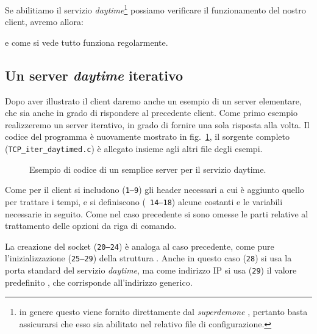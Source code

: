 Se abilitiamo il servizio \textit{daytime}\footnote{in genere questo viene
  fornito direttamente dal \textsl{superdemone} , pertanto basta
  assicurarsi che esso sia abilitato nel relativo file di configurazione.}
possiamo verificare il funzionamento del nostro client, avremo allora:
e come si vede tutto funziona regolarmente.


\subsection{Un server \textit{daytime} iterativo}
\label{sec:TCP_daytime_iter_server}

Dopo aver illustrato il client daremo anche un esempio di un server
elementare, che sia anche in grado di rispondere al precedente client. Come
primo esempio realizzeremo un server iterativo, in grado di fornire una sola
risposta alla volta. Il codice del programma è nuovamente mostrato in
fig.~\ref{fig:TCP_daytime_iter_server_code}, il sorgente completo
(\texttt{TCP\_iter\_daytimed.c}) è allegato insieme agli altri file degli
esempi.

\begin{figure}[!htbp]
  \footnotesize \centering
  \begin{minipage}[c]{\codesamplewidth}
  \end{minipage} 
  \normalsize
  \caption{Esempio di codice di un semplice server per il servizio daytime.}
  \label{fig:TCP_daytime_iter_server_code}
\end{figure}

Come per il client si includono (\texttt{\small 1--9}) gli header necessari a
cui è aggiunto quello per trattare i tempi, e si definiscono (\texttt{\small
  14--18}) alcune costanti e le variabili necessarie in seguito. Come nel caso
precedente si sono omesse le parti relative al trattamento delle opzioni da
riga di comando.

La creazione del socket (\texttt{\small 20--24}) è analoga al caso precedente,
come pure l'inizializzazione (\texttt{\small 25--29}) della struttura
.  Anche in questo caso (\texttt{\small 28}) si usa la
porta standard del servizio \textit{daytime}, ma come indirizzo IP si usa
(\texttt{\small 29}) il valore predefinito , che corrisponde
all'indirizzo generico.

